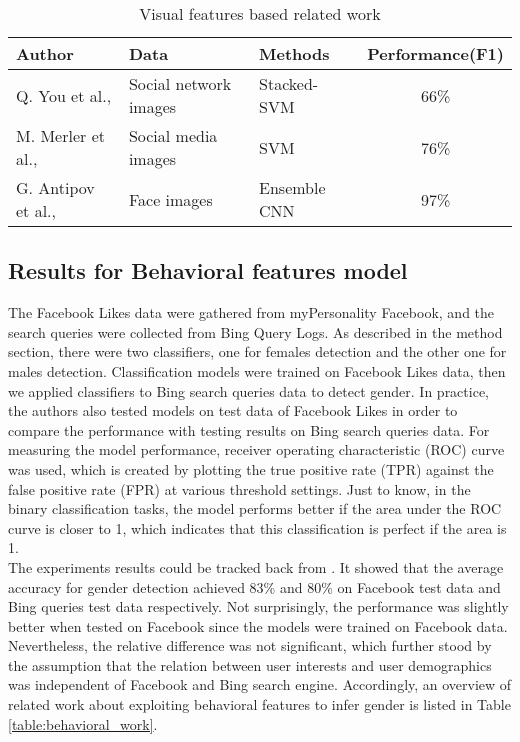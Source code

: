 \documentclass[runningheads]{llncs}
\begin{document}
	
	\begin{table}
		\centering
		\caption{Visual features based related work }
		\begin{tabular}{| l | l | l | c | }
			\hline
			Author  &  Data  & Methods & Performance(F1)\\
			\hline
			Q. You et al.,  \cite{you2014eyes} & Social network images & Stacked-SVM & 66\% \\
			M. Merler et al., \cite{merler2015you} & Social media images & SVM & 76\% \\
			G. Antipov et al.,  \cite{antipov2016minimalistic} & Face images & Ensemble CNN
			& 97\% \\
			\hline
		\end{tabular}
		\label{table:visual_work}
	\end{table}
	
	\subsection{Results for Behavioral features model}
	
	The Facebook Likes data were gathered from myPersonality Facebook, and the search queries were collected from Bing Query Logs. As described in the method section, there were two classifiers, one for females detection and the other one for males detection. Classification models were trained on Facebook Likes data, then we applied classifiers to Bing search queries data to detect gender. In practice, the authors also tested models on test data of Facebook Likes in order to compare the performance with testing results on Bing search queries data. For measuring the model performance, receiver operating characteristic (ROC) curve was used, which is created by plotting the true positive rate (TPR) against the false positive rate (FPR) at various threshold settings. Just to know, in the binary classification tasks, the model performs better if the area under the ROC curve is closer to 1, which indicates that this classification is perfect if the area is 1. \\
	
	The experiments results could be tracked back from \cite{bi2013inferring}. It showed that the average accuracy for gender detection achieved 83\% and 80\% on Facebook test data and Bing queries test data respectively. Not surprisingly, the performance was slightly better when tested on Facebook since the models were trained on Facebook data. Nevertheless, the relative difference was not significant, which further stood by the assumption that the relation between user interests and user demographics was independent of Facebook and Bing search engine. 
	Accordingly, an overview of related work about exploiting behavioral features to infer gender is listed in Table \ref{table:behavioral_work}.
	
\end{document}
